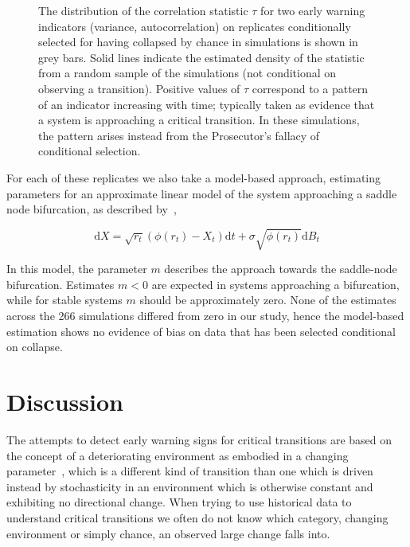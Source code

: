 \documentclass[authoryear,review,12pt]{elsarticle}
\newcommand{\ud}{\mathrm{d}}
\newif\ifhavefigures
\begin{document}
\begin{figure}
  \begin{center}
    \ifhavefigures
    \texttt{[image: figure2]}
    \fi
  \end{center}
  \caption{The distribution of the correlation statistic $\tau$ for two
  early warning indicators (variance, autocorrelation) on replicates
  conditionally selected for having collapsed by chance in simulations
  is shown in grey bars.  Solid lines indicate the estimated density of
  the statistic from a random sample of the simulations (not conditional
  on observing a transition). Positive values of $\tau$ correspond to
  a pattern of an indicator increasing with time; typically taken as
  evidence that a system is approaching a critical transition.  In these
  simulations, the pattern arises instead from the Prosecutor's fallacy
  of conditional selection.}
  \label{fig:indicator}
\end{figure}


For each of these replicates we also take a model-based
approach, estimating parameters for an approximate linear
model of the system approaching a saddle node bifurcation, as
described by~\citet{Boettiger2012b},


\begin{equation}
\ud X = \sqrt{ r_t } (\phi(r_t) - X_t)\ud t + \sigma\sqrt{\phi(r_t) } \ud B_t \label{LSN}
\end{equation}


In this model, the parameter $m$
describes the approach towards the saddle-node bifurcation.  Estimates
$m < 0 $ are expected in systems approaching a bifurcation, while for
stable systems $m$ should be approximately zero. None of the estimates
across the 266 simulations differed from zero in our study, hence the
model-based estimation shows no evidence of bias on data that has been
selected conditional on collapse.



\section{Discussion}


The attempts to detect early warning signs for critical transitions
are based on the concept of a deteriorating environment as embodied
in a changing parameter~\cite{Scheffer2009}, which is a different kind
of transition than one which is driven instead by stochasticity in an
environment which is otherwise constant and exhibiting no directional
change. When trying to use historical data to understand critical
transitions we often do not know which category, changing environment
or simply chance, an observed large change falls into.
\end{document}
